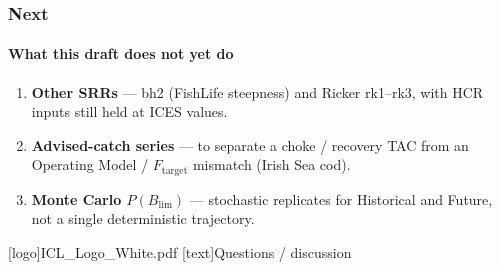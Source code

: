 \documentclass[
  aspectratio=169,
  t,
  onlytextwidth,
  10pt,
]{beamer}
\newcommand{\Ftar}{F_{\mathrm{target}}}
\newcommand{\Blim}{B_{\lim}}
\begin{document}
\begin{frame}
  \frametitle{Next}
  \framesubtitle{What this draft does not yet do}

  \begin{enumerate}
    \item \textbf{Other SRRs} --- bh2 (FishLife steepness) and Ricker rk1--rk3,
          with HCR inputs still held at ICES values.
    \item \textbf{Advised-catch series} --- to separate a choke / recovery TAC
          from an Operating Model / $\Ftar$ mismatch (Irish Sea cod).
    \item \textbf{Monte Carlo $P(\Blim)$} --- stochastic replicates for Historical
          and Future, not a single deterministic trajectory.
  \end{enumerate}
\end{frame}

\begingroup
  [logo]{ICL_Logo_White.pdf}
  [text]{Questions / discussion}
\endgroup
\end{document}
